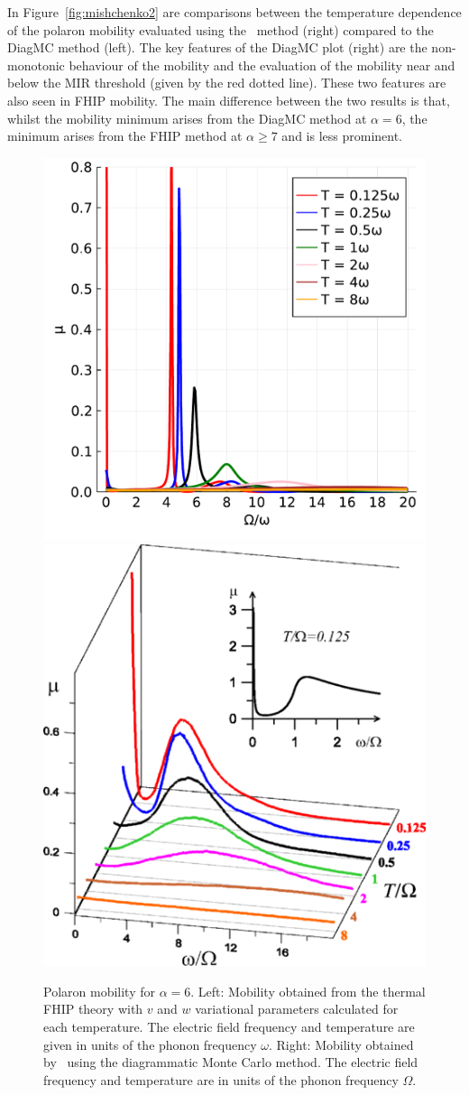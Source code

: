 In Figure~\ref{fig:mishchenko2} are comparisons between the temperature dependence of the polaron mobility evaluated using the~\cite{feynman_mobility_1962} method (right) compared to the~\cite{mishchenko_polaron_2019} DiagMC method (left). The key features of the DiagMC plot (right) are the non-monotonic behaviour of the mobility and the evaluation of the mobility near and below the MIR threshold (given by the red dotted line). These two features are also seen in FHIP mobility. The main difference between the two results is that, whilst the mobility minimum arises from the DiagMC method at $\alpha = 6$, the minimum arises from the FHIP method at $\alpha \geq 7$ and is less prominent. 
\begin{figure}[t]
    \centering
    \includegraphics[width=.49\textwidth]{figures/Mischenko_comparison.pdf}
    \includegraphics[width=.49\textwidth]{figures/medium.png}
    
    \caption{Polaron mobility for $\alpha = 6$. Left: Mobility obtained from the thermal FHIP theory with $v$ and $w$ variational parameters calculated for each temperature. The electric field frequency and temperature are given in units of the phonon frequency $\omega$. Right: Mobility obtained by~\cite{mishchenko_polaron_2019} using the diagrammatic Monte Carlo method. The electric field frequency and temperature are in units of the phonon frequency $\Omega$.}
    \label{fig:mishchenko}
\end{figure}
